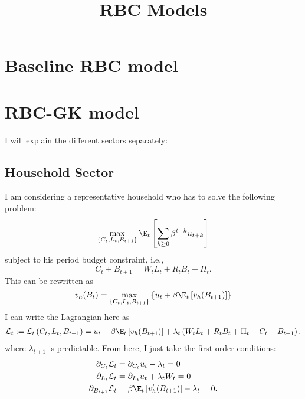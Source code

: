 \documentclass{article}
\title{RBC Models}
\begin{document}
	\maketitle

	\section{Baseline RBC model}
		
	\section{RBC-GK model}

	I will explain the different sectors separately:
	\subsection{Household Sector}
	I am considering a representative household who has to solve the following problem:
	\begin{equation}
		\max_{\{C_t, L_t, B_{t+1}\}} \E_t\left[\sum_{k\geq 0}\beta^{t+k} u_{t+k}\right]
	\end{equation}
	subject to his period budget constraint, i.e.,
	\begin{equation}
		C_t + B_{t+1}  = W_t L_t +R_tB_t + \Pi_t.
	\end{equation}
	This can be rewritten as
	\begin{equation}
		v_h(B_t) = \max_{\{C_t, L_t, B_{t+1}\}}\left\{u_t + \beta\E_t\left[v_h(B_{t+1})\right]\right\}
	\end{equation}
	I can write the Lagrangian here as
	\begin{equation}
		\begin{aligned}
			\mathcal{L}_t := \mathcal{L}_t\left(C_t, L_t, B_{t+1}\right) &= u_t + \beta\E_t\left[v_h(B_{t+1})\right]  + \lambda_{t}\left(W_t L_t + R_t B_t + \Pi_t - C_t - B_{t+1}\right).\\
		\end{aligned}
	\end{equation}
	where $\lambda_{t+1}$ is predictable. From here, I just take the first order conditions:
	\begin{align}
		\partial_{C_t} \mathcal{L}_t & = \partial_{C_t} u_t - \lambda_t = 0\label{FOC:RBC-GK_1_1}\\
		\partial_{L_t} \mathcal{L}_t & = \partial_{L_t} u_t + \lambda_t W_t  = 0\label{FOC:RBC-GK_1_2}\\
		\partial_{B_{t+1}}\mathcal{L}_t & = \beta\E_t\left[v_h'(B_{t+1})\right]-\lambda_t = 0. \label{FOC:RBC-GK_1_3}
	\end{align}
\end{document}
